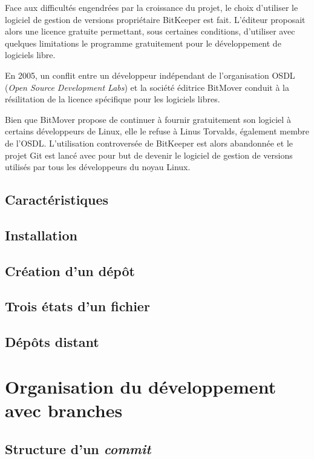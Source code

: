 \documentclass[11pt,a4paper]{article}
\begin{document}
Face aux difficultés engendrées par la croissance du projet, le choix d'utiliser le logiciel de gestion de versions propriétaire BitKeeper est fait. L'éditeur proposait alors une licence gratuite permettant, sous certaines conditions, d'utiliser avec quelques limitations le programme gratuitement pour le développement de logiciels libre.

En 2005, un conflit entre un développeur indépendant de l'organisation OSDL (\textit{Open Source Development Labs}) et la société éditrice BitMover conduit à la résilitation de la licence spécifique pour les logiciels libres.

Bien que BitMover propose de continuer à fournir gratuitement son logiciel à certains développeurs de Linux, elle le refuse à Linus Torvalds, également membre de l'OSDL. L'utilisation controversée de BitKeeper est alors abandonnée et le projet Git est lancé avec pour but de devenir le logiciel de gestion de versions utilisés par tous les développeurs du noyau Linux.

\subsection{Caractéristiques}

\subsection{Installation}

\subsection{Création d'un dépôt}

\subsection{Trois états d'un fichier}

\subsection{Dépôts distant}

\section{Organisation du développement avec branches}

\subsection{Structure d'un \textit{commit}}
\end{document}
